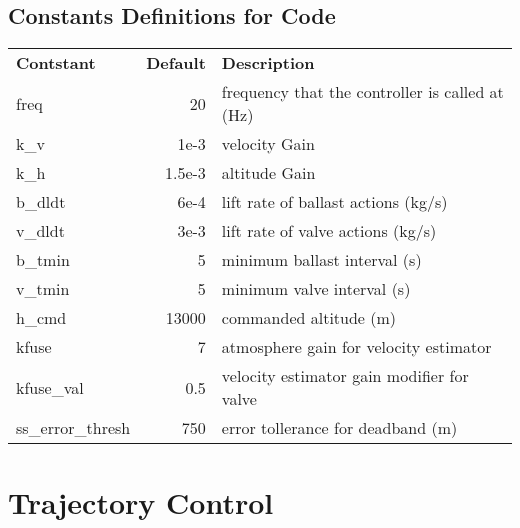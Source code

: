 \documentclass[11pt]{article}
\begin{document}
\subsection{Constants Definitions for Code}
\begin{table}[h!]
\rmfamily
\begin{tabular}{l r  l} 
\sffamily \textbf{Contstant} &\sffamily \textbf{Default} &\sffamily \textbf{Description} \\

{\ttfamily freq}              & 20 & frequency that the controller is called at (Hz) \\
{\ttfamily k\_v            }  & 1e-3  & velocity Gain \\
{\ttfamily k\_h            }  & 1.5e-3  & altitude Gain   \\
{\ttfamily b\_dldt         }  & 6e-4  & lift rate of ballast actions (kg/s) \\
{\ttfamily v\_dldt         }  & 3e-3  & lift rate of valve actions  (kg/s) \\
{\ttfamily b\_tmin         }  & 5  & minimum ballast interval (s)   \\
{\ttfamily v\_tmin         }  & 5  & minimum valve interval (s)\\
{\ttfamily h\_cmd          }  & 13000  & commanded altitude (m)   \\
{\ttfamily kfuse           }  & 7  & atmosphere gain for velocity estimator   \\
{\ttfamily kfuse\_val      }  & 0.5  & velocity estimator gain modifier for valve  \\
{\ttfamily ss\_error\_thresh} & 750  & error tollerance for deadband (m) \\
\end{tabular}
\end{table}

\section{Trajectory Control}
\end{document}

